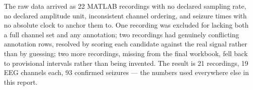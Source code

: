 \begin{summarybox}
The raw data arrived as 22 MATLAB recordings with no declared sampling rate, no declared
amplitude unit, inconsistent channel ordering, and seizure times with no absolute clock to
anchor them to. One recording was excluded for lacking both a full channel set and any
annotation; two recordings had genuinely conflicting annotation rows, resolved by scoring each
candidate against the real signal rather than by guessing; two more recordings, missing from the
final workbook, fell back to provisional intervals rather than being invented. The result is 21
recordings, 19 EEG channels each, 93 confirmed seizures --- the numbers used everywhere else in
this report.
\end{summarybox}
